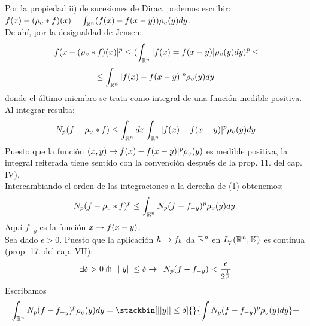 Por la propiedad ii) de sucesiones de Dirac, podemos escribir: \\
$f(x)-(\rho_\upsilon * f)(x)=\int_{\mathbb{R}^n} (f(x)-f(x-y))\rho_\upsilon (y)dy$.\\
De ahí, por la desigualdad de Jensen:
$$
|f(x-(\rho_\upsilon * f)(x)|^p \leq (\int_{\mathbb{R}^n} |f(x)=f(x-y)|\rho_\upsilon (y)dy)^p \leq 
$$
$$
\leq \int_{\mathbb{R}^n} |f(x)-f(x-y)|^p \rho_\upsilon (y)dy
$$
donde el último miembro se trata como integral de una función medible positiva. \\
Al integrar resulta: 
\begin{equation}
N_p (f-\rho_\upsilon * f) \leq \int_{\mathbb{R}^n}dx \int_{\mathbb{R}^n}|f(x)-f(x-y)|^p \rho_\upsilon (y)dy
\end{equation}
Puesto que la función $(x,y) \rightarrow f(x)-f(x-y)|^p \rho_\upsilon (y)$
es medible positiva, la integral reiterada tiene sentido con la convención después de la prop. 11. del cap. IV). \\
Intercambiando el orden de las integraciones a la derecha de (1) obtenemos: 
\begin{equation}
N_p (f-\rho_\upsilon *f)^p \leq \int_{\mathbb{R}^n} N_p (f-f_{-y})^p \rho_\upsilon (y)dy.
\end{equation}
Aquí $f_{-y}$ es la función $x \rightarrow f(x-y)$. \\
Sea dado $\epsilon>0$. Puesto que la aplicación $h \rightarrow f_h$ da $\mathbb{R}^n$ en $L_p(\mathbb{R}^n, \mathbb{K})$ es continua (prop. 17. del cap. VII): \\
$$
\exists \delta >0 \pitchfork \phantom{s} ||y|| \leq \delta \rightarrow \phantom{s} N_p (f-f_{-y})<\frac{\epsilon}{2^{\frac{1}{p}}}
$$
Escribamos
\begin{equation}
\int_{\Rn}N_p (f-f_{-y})^p \rho_\upsilon (y)dy=\stackbin[||y|| \leq \delta]{}{\int N_p (f-f_{-y})^p\rho_\upsilon (y)dy}+
\end{equation}

